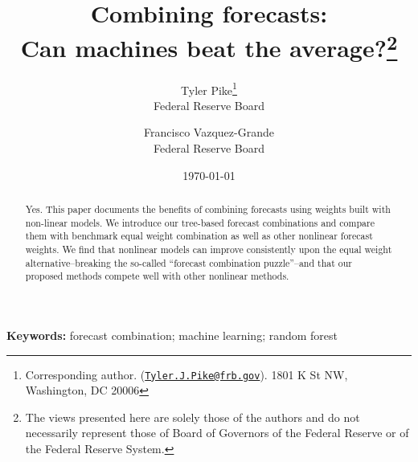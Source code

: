 \documentclass[12pt]{article}
\title{Combining forecasts: \\Can machines beat the average?\footnote{The views presented here are solely those of the authors and do not necessarily represent those of Board of Governors of the Federal Reserve or of the Federal Reserve System.}}
\author{Tyler Pike\thanks{Corresponding author. (\texttt{\href{mailto:Tyler.J.Pike@frb.gov}{Tyler.J.Pike@frb.gov}}). 1801 K St NW, Washington, DC 20006} \\ Federal Reserve Board \and Francisco Vazquez-Grande \\ Federal Reserve Board }
\date{\today}
\providecommand{\keywords}[1]
{
  \small	
  \textbf{Keywords:} #1
}
\begin{document}
\maketitle

\begin{abstract}
    Yes. This paper documents the benefits of combining forecasts using weights built with non-linear models.  We introduce our tree-based forecast combinations and compare them with benchmark equal weight combination as well as other nonlinear forecast weights. We find that nonlinear models can improve consistently upon the equal weight alternative--breaking the so-called ``forecast combination puzzle''--and that our proposed methods compete well with other nonlinear methods. \\

\end{abstract}
\keywords{forecast combination; machine learning; random forest}

\clearpage


%
\end{document}
